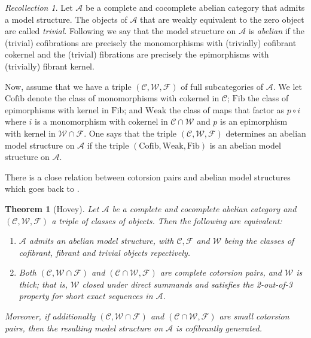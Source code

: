 \documentclass{amsart}
\newcommand{\GD}[1]{{\color{ForestGreen} G: [#1]}}
\def \A{{\mathcal A}}
\def \C{{\mathcal C}}
\def \F{{\mathcal F}}
\def \W{{\mathcal W}}
\numberwithin{equation}{section}%
\newtheorem{theorem}[equation]{Theorem}
\theoremstyle{remark}
\newtheorem{recollection}[equation]{Recollection}
\begin{document}
\begin{recollection}
    Let $\A$ be a complete and cocomplete abelian category that admits a model structure. The objects of $\mathcal{A}$ that are weakly equivalent to the zero object are called \textit{trivial}. Following \cite{Hov02} we say that the model structure on $\A$ is \textit{abelian} if the (trivial) cofibrations are precisely the monomorphisms with (trivially) cofibrant cokernel and the (trivial) fibrations are precisely the  epimorphisms with (trivially) fibrant kernel. 
    
    Now, assume that we have a triple $(\C,\W,\F)$ of full subcategories of $\A$. We let $\mathrm{Cofib}$ denote the class of monomorphisms with cokernel in $\C$; $\mathrm{Fib}$ the class of epimorphisms with kernel in $\mathrm{Fib}$; and $\mathrm{Weak}$ the class of maps that factor as $p\circ i$ where $i$ is a monomorphism with cokernel in $\C\cap\W$ and $p$ is an epimorphism with kernel in $\W\cap\F$. 
    One says that the triple $(\C,\W,\F)$ determines an abelian model structure on $\A$ if the triple $(\mathrm{Cofib},\mathrm{Weak},\mathrm{Fib})$ is an abelian model structure on $\A$.
\end{recollection}

There is a close relation between cotorsion pairs and abelian model structures which goes back to \cite[Theorem 2.2]{Hov02}.

\begin{theorem}[Hovey]
\label{thm:Hovey}
    Let $\A$ be a complete and cocomplete abelian category and $(\C,\W,\F)$ a triple of classes of objects. Then the following are equivalent: 
    \begin{enumerate}
        \item  $\A$ admits an abelian model structure, with $\C, \F$ and $\W$ being the classes of cofibrant, fibrant and trivial objects repectively.
        \item Both $(\C,\W\cap \F)$ and $(\C\cap \W,\F)$ are complete cotorsion pairs, and $\W$ is thick; that is, $\W$ closed under direct summands and satisfies the 2-out-of-3 property for short exact sequences in $\A$.
    \end{enumerate}
    Moreover, if additionally  $(\C,\W\cap \F)$ and $(\C\cap \W,\F)$ are small cotorsion pairs, then the resulting model structure on $\A$ is cofibrantly generated. 
\end{theorem}
\end{document}
